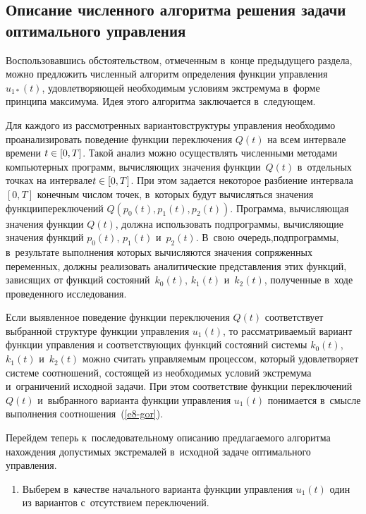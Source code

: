 \begin{multicols}{2}
{}

\section{Описание численного алгоритма решения задачи оптимального управления}

Воспользовавшись обстоятельством, отмеченным в~конце предыдущего раздела,  
можно предложить численный алгоритм определения функции управления $u_{1*}(t)$, 
удовлетворяющей необходимым условиям экстремума в~форме принципа максимума. Идея 
этого алгоритма заключается в~сле\-ду\-ющем.

Для каждого из рассмотренных вариантов\linebreak структуры управления необходимо
проанализировать поведение функции переключения $Q(t)$ на всем интервале времени
$t\hm\in[0,T]$.
Такой анализ можно осуществлять численными
методами компьютерных программ, вычисляющих значения
функции~$Q(t)$ в~отдельных точках на интервале\linebreak $t\hm\in[0,T]$.
%
 При этом задается некоторое разбиение  интервала $[0,T]$ конечным числом точек,\linebreak 
 в~которых будут вычисляться значения функции\linebreak переключений $Q(p_0(t),p_1(t),p_2(t))$. 
 Программа, вы\-чис\-ля\-ющая значения функции $Q(t)$, должна использовать подпрограммы, 
 вычисляющие значения функций $p_0(t)$, $p_1(t)$ и~$p_2(t)$. В~свою очередь,\linebreak подпрограммы, 
 в~результате выполнения которых вычисляются значения сопряженных переменных, 
 должны реализовать аналитические представления этих функций, зависящих от функций 
 со\-сто\-яний~$k_0(t)$, $k_1(t)$ и~$k_2(t)$, полученные в~ходе проведенного исследования.

Если выявленное поведение функции переключения $Q(t)$ соответствует выбранной структуре
функции управления $u_1(t)$, то рассматриваемый вариант функции управления
и соответствующих функций состояний системы $k_0(t)$, $k_1(t)$ и~$k_2(t)$
можно считать управляемым процессом, который удовле\-тво\-ря\-ет системе соотношений, 
состоящей из необходимых условий экстремума и~ограничений исходной задачи. 
При этом соответствие функции переключений $Q(t)$ и~выбранного варианта функции 
управления $u_1(t)$ понимается в~смысле выполнения соотношения~(\ref{e8-gor}).

Перейдем теперь к~последовательному описанию предлагаемого алгоритма нахождения 
до\-пус\-ти\-мых экстремалей в~исходной задаче оптимального управления.
\begin{enumerate}[1.]
\item Выберем в~качестве начального варианта функции управления $u_{1}(t)$ 
один из вариантов с~отсутствием переключений.\\[-15pt]


\end{enumerate}
\end{multicols}
